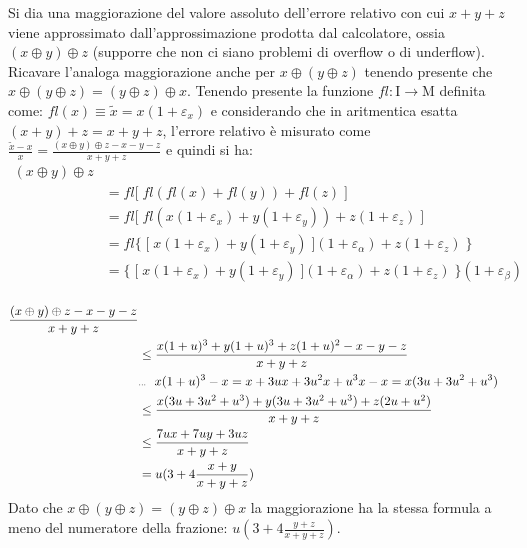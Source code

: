 Si dia una maggiorazione del valore assoluto dell’errore relativo con cui $x + y + z$ viene approssimato dall’approssimazione prodotta dal calcolatore, ossia $(x \oplus y) \oplus z$ (supporre che non ci siano problemi di overflow o di underflow). Ricavare l’analoga maggiorazione anche per $x \oplus (y \oplus z)$ tenendo presente che $x \oplus (y \oplus z) = (y \oplus z) \oplus x$.
\PP
Tenendo presente la funzione $fl: \mathrm{I} \rightarrow \mathrm{M}$ definita come: $fl(x) \equiv \tilde{x} = x(1+\varepsilon_x)$ e considerando che in aritmentica esatta $(x+y)+z = x+y+z$, l'errore relativo è misurato come $\frac{\tilde{x}-x}{x} = \frac{(x \oplus y) \oplus z - x - y - z}{x+y+z}$ e quindi si ha:
\begin{equation*}
	\begin{split}
		(x \oplus y) \oplus z \\
			& = fl \lbrack \; fl(fl(x) + fl(y)) + fl(z) \;\rbrack \\
			& = fl \lbrack \; fl(x(1+\varepsilon_x) + y(1+\varepsilon_y)) + z(1+\varepsilon_z) \; \rbrack \\
			& = fl \{ \; \lbrack \; x(1+\varepsilon_x) + y(1+\varepsilon_y) \; \rbrack (1 + \varepsilon_{\alpha}) + z(1+\varepsilon_z) \; \} \\
	  		& = \{ \; \lbrack \; x(1+\varepsilon_x) + y(1+\varepsilon_y) \; \rbrack (1 + \varepsilon_{\alpha}) + z(1+\varepsilon_z) \; \} (1 + \varepsilon_{\beta}) \\
	\end{split}
\end{equation*}

\begin{equation*}
	\begin{split}
		\frac{(x \oplus y) \oplus z - x - y - z}{x+y+z} \\
			& \leq \frac{x(1+u)^3 + y(1+u)^3 + z(1+u)^2 -x -y -z}{x+y+z} \\
			& \tiny{\text{...} \quad x(1+u)^3 - x = x+3ux+3u^2x+u^3x-x = x(3u+3u^2+u^3)} \\
	 		& \leq \frac{x(3u+3u^2+u^3) + y(3u+3u^2+u^3) + z(2u+u^2)}{x+y+z} \\
	 		& \leq \frac{7ux+7uy+3uz}{x+y+z} \\
	 		& = u(3+4 \frac{x+y}{x+y+z})
	\end{split}
\end{equation*}
Dato che $x \oplus (y \oplus z) = (y \oplus z) \oplus x$ la maggiorazione ha la stessa formula a meno del numeratore della frazione: $ u(3+4 \frac{y+z}{x+y+z})$.


